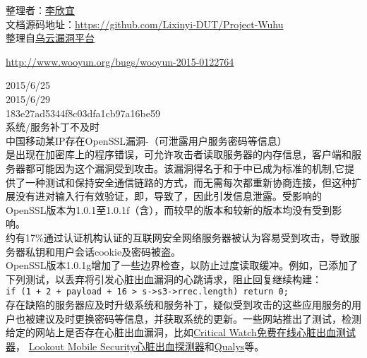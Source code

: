 \documentclass{leptc}
\begin{document}
整理者：\href{mailto:lxy_September@outlook.com}{李欣宜} \\
文档源码地址：\url{https://github.com/Lixinyi-DUT/Project-Wuhu}\\
整理自\href{http://www.wooyun.org/}{乌云漏洞平台}

\begin{center}
\end{center} 

\begin{center}
	\url{http://www.wooyun.org/bugs/wooyun-2015-0122764}
\end{center}
 2015/6/25 \\
 2015/6/29 \\
 183e27ad5344f8c03dfa1cb97a16be59 \\
 系统/服务补丁不及时 \\
 中国移动某IP存在OpenSSL漏洞-（可泄露用户服务密码等信息）\\
是出现在加密库上的程序错误，可允许攻击者读取服务器的内存信息，客户端和服务器都可能因为这个漏洞受到攻击。该漏洞得名于和于中已成为标准的机制,它提供了一种测试和保持安全通信链路的方式，而无需每次都重新协商连接，但这种扩展没有进对输入行有效验证，即，导致了，因此引发信息泄露。受影响的OpenSSL版本为1.0.1至1.0.1f（含），而较早的版本和较新的版本均没有受到影响。\\
 约有17\%通过认证机构认证的互联网安全网络服务器被认为容易受到攻击，导致服务器私钥和用户会话cookie及密码被盗。\\
 OpenSSL版本1.0.1g增加了一些边界检查，以防止过度读取缓冲。例如，已添加了下列测试，以丢弃将引发心脏出血漏洞的心跳请求，阻止回复继续构建：\\
	\verb|if (1 + 2 + payload + 16 > s->s3->rrec.length) return 0;|\\
存在缺陷的服务器应及时升级系统和服务补丁，疑似受到攻击的这些应用服务的用户也被建议及时更换密码等信息，并获取系统的更新。一些网站推出了测试，检测给定的网站上是否存在心脏出血漏洞，比如\href{http://heartbleed.criticalwatch.com/}{Critical Watch免费在线心脏出血测试器}， \href{https://blog.lookout.com/blog/2014/04/09/heartbleed-detector/}{Lookout Mobile Security心脏出血探测器}和\href{https://www.ssllabs.com/ssltest/}{Qualys}等。\\
\end{document}
